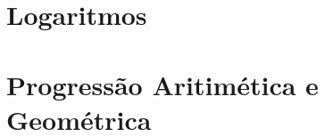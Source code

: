 \documentclass{article}
\begin{document}
\section{Logaritmos}

\section{Progressão Aritimética e Geométrica}
\end{document}
